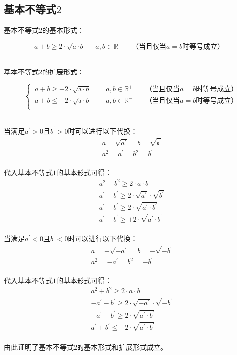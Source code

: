 \documentclass[UTF8]{ctexart}
\begin{document}
\newpage

\subsection{基本不等式$2$}
    基本不等式$2$的基本形式：
    \begin{large}
        \begin{equation*}
            a+b \geq 2\cdot\sqrt{a\cdot b}~~~~~~~a,b\in\mathbb{R^+}~~~~~~\text{（当且仅当$a=b$时等号成立）}
        \end{equation*}
    \end{large}\\
    基本不等式$2$的扩展形式：\vspace{3pt}
    \begin{large}
        \begin{equation*}
            ~~~~
            \begin{cases}
                ~a+b\geq +2\cdot\sqrt{a\cdot b}~~~~~~~~~~a,b\in\mathbb{R^+}~~~~~~~~\text{（当且仅当$a=b$时等号成立）}\\[1mm]
                ~a+b\leq -2\cdot\sqrt{a\cdot b}~~~~~~~~~~a,b\in\mathbb{R^-}~~~~~~~~\text{（当且仅当$a=b$时等号成立）}\\[1mm]
            \end{cases}
        \end{equation*}
    \end{large}\\[2mm]
    当满足$a^{'}>0$且$b^{'}>0$时可以进行以下代换：
    \setcounter{equation}{0}
    \begin{align}
        &a=\sqrt{a^{'}}~~~~~~b=\sqrt{b^{'}}\\[2mm]
        &a^2=a^{'}~~~~~~b^2=b^{'}
    \end{align}\\
    代入基本不等式$1$的基本形式可得：
    \begin{align}
        &a^2+b^2\geq 2\cdot a\cdot b\\[3mm]
        &a^{'}+b^{'}\geq 2\cdot\sqrt{a^{'}}\cdot\sqrt{b^{'}}\\[3mm]
        &a^{'}+b^{'}\geq 2\cdot\sqrt{a^{'}\cdot b^{'}}\\[3mm]
        &a^{'}+b^{'}\geq +2\cdot\sqrt{a^{'}\cdot b^{'}}
    \end{align}\\
    当满足$a^{'}<0$且$b^{'}<0$时可以进行以下代换：
    \begin{align}
        &a=-\sqrt{-a^{'}}~~~~~~b=-\sqrt{-b^{'}}\\[2mm]
        &a^2=-a^{'}~~~~~~b^2=-b^{'}
    \end{align}\\
    代入基本不等式$1$的基本形式可得：
    \begin{align}
        &a^2+b^2\geq 2\cdot a\cdot b\\[3mm]
        &-a^{'}-b^{'}\geq 2\cdot\sqrt{-a^{'}}\cdot\sqrt{-b^{'}}\\[3mm]
        &-a^{'}-b^{'}\geq 2\cdot\sqrt{a^{'}\cdot b^{'}}\\[3mm]
        &a^{'}+b^{'}\leq -2\cdot\sqrt{a^{'}\cdot b^{'}}
    \end{align}\\
    由此证明了基本不等式$2$的基本形式和扩展形式成立。
\end{document}
